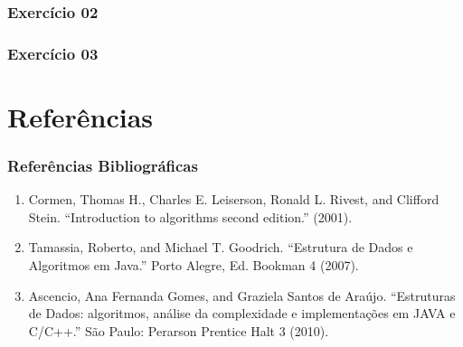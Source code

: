 \documentclass{beamer}
\begin{document}
\begin{frame}
	\frametitle{Exercício 02}
    
\end{frame}

\begin{frame}
	\frametitle{Exercício 03}
    
\end{frame}

\section{Referências}

\begin{frame}
    \frametitle{Referências Bibliográficas}
    \begin{enumerate}
        \item Cormen, Thomas H., Charles E. Leiserson, Ronald L. Rivest, and Clifford Stein. ``Introduction to algorithms second edition.'' (2001).
        \item Tamassia, Roberto, and Michael T. Goodrich. ``Estrutura de Dados e Algoritmos em Java.'' Porto Alegre, Ed. Bookman 4 (2007).
        \item Ascencio, Ana Fernanda Gomes, and Graziela Santos de Araújo. ``Estruturas de Dados: algoritmos, análise da complexidade e implementações em JAVA e C/C++.'' São Paulo: Perarson Prentice Halt 3 (2010).
    \end{enumerate}
\end{frame}
\end{document}

